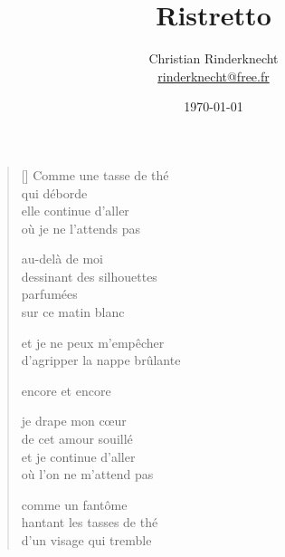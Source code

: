 \documentclass[12pt,a4paper]{article}
\title{Ristretto}
\author{Christian Rinderknecht\\
{\small \url{rinderknecht@free.fr}}}
\date{\today}
\begin{document}
\maketitle

\thispagestyle{empty}

\newpage\leavevmode\thispagestyle{empty}\newpage


\newpage

\poemtitle{}

\settowidth{\versewidth}{d'agripper le nappe brûlante}

\bigskip

\begin{verse}[\versewidth]
  Comme une tasse de thé \\
  qui déborde \\

  elle continue d'aller \\
  où je ne l'attends pas

  au-delà de moi \\
  dessinant des silhouettes \\
  parfumées \\
  sur ce matin blanc

  et je ne peux m'empêcher \\
  d'agripper la nappe brûlante

  encore et encore

  je drape mon cœur \\
  de cet amour souillé \\
  et je continue d'aller \\
  où l'on ne m'attend pas

  comme un fantôme \\
  hantant les tasses de thé \\
  d'un visage qui tremble
\end{verse}


\newpage

\poemtitle{}

\settowidth{\versewidth}{J'aimerais que nous soyons eux}

\bigskip
\end{document}
